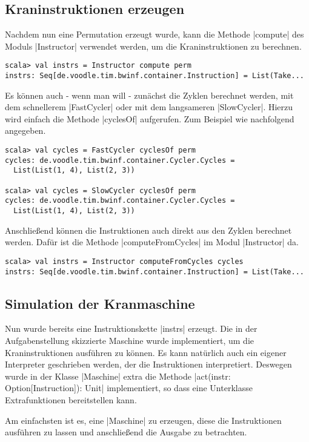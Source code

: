 \subsection{Kraninstruktionen erzeugen}
Nachdem nun eine Permutation erzeugt wurde, kann die Methode |compute| des Moduls |Instructor| verwendet werden, um die Kraninstruktionen zu berechnen.
\begin{lstlisting}
scala> val instrs = Instructor compute perm
instrs: Seq[de.voodle.tim.bwinf.container.Instruction] = List(Take...
\end{lstlisting}
Es können auch - wenn man will - zunächst die Zyklen berechnet werden, mit dem schnellerem |FastCycler| oder mit dem langsameren |SlowCycler|.
Hierzu wird einfach die Methode |cyclesOf| aufgerufen. Zum Beispiel wie nachfolgend angegeben.
\begin{lstlisting}
scala> val cycles = FastCycler cyclesOf perm
cycles: de.voodle.tim.bwinf.container.Cycler.Cycles =
  List(List(1, 4), List(2, 3))

scala> val cycles = SlowCycler cyclesOf perm
cycles: de.voodle.tim.bwinf.container.Cycler.Cycles =
  List(List(1, 4), List(2, 3))
\end{lstlisting}
Anschließend können die Instruktionen auch direkt aus den Zyklen berechnet werden. Dafür ist die Methode |computeFromCycles| im Modul |Instructor| da.
\begin{lstlisting}
scala> val instrs = Instructor computeFromCycles cycles
instrs: Seq[de.voodle.tim.bwinf.container.Instruction] = List(Take...
\end{lstlisting}
\clearpage
\subsection{Simulation der Kranmaschine}
 Nun wurde bereits eine Instruktionskette |instrs| erzeugt.
 Die in der Aufgabenstellung skizzierte Maschine wurde implementiert, um die Kraninstruktionen ausführen zu können.
 Es kann natürlich auch ein eigener Interpreter geschrieben werden, der die Instruktionen interpretiert.
 Deswegen wurde in der Klasse |Maschine| extra die Methode |act(instr: Option[Instruction]): Unit| implementiert, so dass eine Unterklasse Extrafunktionen bereitstellen kann.

 Am einfachsten ist es, eine |Maschine| zu erzeugen, diese die Instruktionen ausführen zu lassen und anschließend die Ausgabe zu betrachten.

